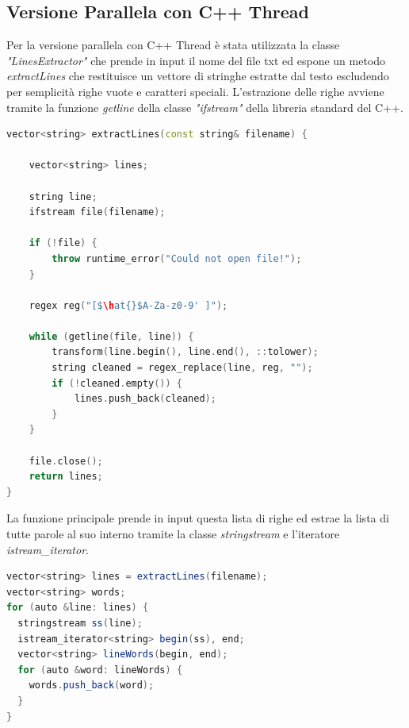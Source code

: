 \documentclass[10pt,twocolumn,letterpaper]{article}
\begin{document}
\subsection{Versione Parallela con C++ Thread}
Per la versione parallela con C++ Thread è stata utilizzata la classe \textit{"LinesExtractor"} che prende in input il nome del file txt ed espone un metodo \textit{extractLines} che restituisce un vettore di stringhe estratte dal testo escludendo per semplicità righe vuote e caratteri speciali. L'estrazione delle righe avviene tramite la funzione \textit{getline} della classe \textit{"ifstream"} della libreria standard del C++.\clearpage

\begin{lstlisting}[basicstyle=\scriptsize, language=C++, frame=single, caption={Esempio di estrazione di righe da un file in C++},captionpos=b,showstringspaces=false, mathescape=true]
vector<string> extractLines(const string& filename) {

    vector<string> lines;

    string line;
    ifstream file(filename);

    if (!file) {
        throw runtime_error("Could not open file!");
    }

    regex reg("[$\hat{}$A-Za-z0-9' ]");

    while (getline(file, line)) {
        transform(line.begin(), line.end(), ::tolower);
        string cleaned = regex_replace(line, reg, "");
        if (!cleaned.empty()) {
            lines.push_back(cleaned);
        }
    }

    file.close();
    return lines;
}
\end{lstlisting}

La funzione principale prende in input questa lista di righe ed estrae la lista di tutte parole al suo interno tramite la classe \textit{stringstream} e l'iteratore \textit{istream\_iterator}. 
\begin{lstlisting}[basicstyle=\scriptsize, language=Java, frame=single, caption={Esempio di estrazione di parole in C++},captionpos=b, showstringspaces=false]
vector<string> lines = extractLines(filename);
vector<string> words;
for (auto &line: lines) {
  stringstream ss(line);
  istream_iterator<string> begin(ss), end;
  vector<string> lineWords(begin, end);
  for (auto &word: lineWords) {
    words.push_back(word);
  }
}
\end{lstlisting}
\end{document}
